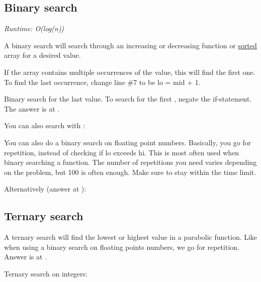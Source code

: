 
\subsection*{Binary search}

\textit{Runtime: O(log(n))}

A binary search will search through an increasing or decreasing function or \underline{sorted} array for a desired value.



If the array contains multiple occurrences of the value, this will find the first one. To find the last occurrence, change line \#7 to be lo = mid + 1.



Binary search for the last  value. To search for the first , negate the if-statement. The answer is at .



You can also search with :



You can also do a binary search on floating point numbers. Basically, you go for repetition, instead of checking if lo exceeds hi. This is most often used when binary searching a function. The number of repetitions you need varies depending on the problem, but 100 is often enough. Make sure to stay within the time limit.



Alternatively (answer at ):



\subsection*{Ternary search}

A ternary search will find the lowest or highest value in a parabolic function. Like when using a binary search on floating points numbers, we go for repetition. Answer is at .



Ternary search on integers:



\newpage
